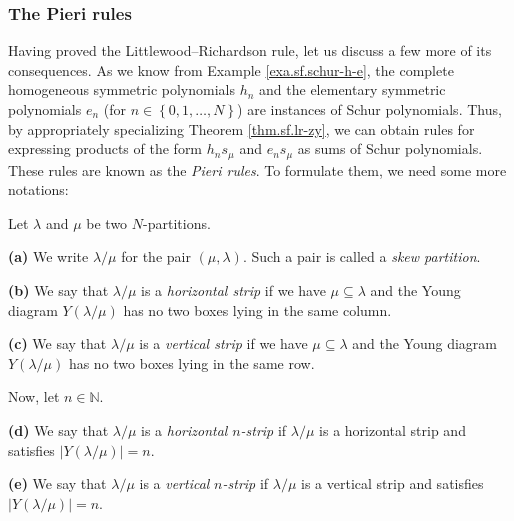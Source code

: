 \subsubsection{The Pieri rules}

Having proved the Littlewood--Richardson rule, let us discuss a few more of
its consequences. As we know from Example \ref{exa.sf.schur-h-e}, the complete
homogeneous symmetric polynomials $h_{n}$ and the elementary symmetric
polynomials $e_{n}$ (for $n\in\left\{  0,1,\ldots,N\right\}  $) are instances
of Schur polynomials. Thus, by appropriately specializing Theorem
\ref{thm.sf.lr-zy}, we can obtain rules for expressing products of the form
$h_{n}s_{\mu}$ and $e_{n}s_{\mu}$ as sums of Schur polynomials. These rules
are known as the \emph{Pieri rules}. To formulate them, we need some more notations:

\begin{definition}
\label{def.sf.strips}Let $\lambda$ and $\mu$ be two $N$-partitions. \medskip

\textbf{(a)} We write $\lambda/\mu$ for the pair $\left(  \mu,\lambda\right)
$. Such a pair is called a \emph{skew partition}. \medskip

\textbf{(b)} We say that $\lambda/\mu$ is a \emph{horizontal strip} if we have
$\mu\subseteq\lambda$ and the Young diagram $Y\left(  \lambda/\mu\right)  $
has no two boxes lying in the same column. \medskip

\textbf{(c)} We say that $\lambda/\mu$ is a \emph{vertical strip} if we have
$\mu\subseteq\lambda$ and the Young diagram $Y\left(  \lambda/\mu\right)  $
has no two boxes lying in the same row. \medskip

Now, let $n\in\mathbb{N}$. \medskip

\textbf{(d)} We say that $\lambda/\mu$ is a \emph{horizontal }$n$\emph{-strip}
if $\lambda/\mu$ is a horizontal strip and satisfies $\left\vert Y\left(
\lambda/\mu\right)  \right\vert =n$. \medskip

\textbf{(e)} We say that $\lambda/\mu$ is a \emph{vertical }$n$\emph{-strip}
if $\lambda/\mu$ is a vertical strip and satisfies $\left\vert Y\left(
\lambda/\mu\right)  \right\vert =n$.
\end{definition}

\Needspace{40pc}

